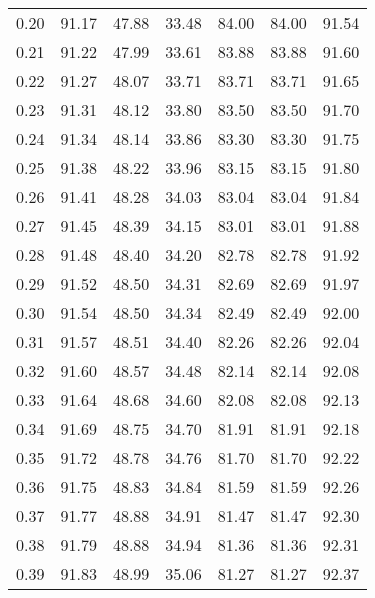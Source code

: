 \begin{tabular}{|c|c|c|c|c|c|c|}
      0.20 &     91.17 &     47.88 &      33.48 &   84.00 &      84.00 &         91.54 \\
      0.21 &     91.22 &     47.99 &      33.61 &   83.88 &      83.88 &         91.60 \\
      0.22 &     91.27 &     48.07 &      33.71 &   83.71 &      83.71 &         91.65 \\
      0.23 &     91.31 &     48.12 &      33.80 &   83.50 &      83.50 &         91.70 \\
      0.24 &     91.34 &     48.14 &      33.86 &   83.30 &      83.30 &         91.75 \\
      0.25 &     91.38 &     48.22 &      33.96 &   83.15 &      83.15 &         91.80 \\
      0.26 &     91.41 &     48.28 &      34.03 &   83.04 &      83.04 &         91.84 \\
      0.27 &     91.45 &     48.39 &      34.15 &   83.01 &      83.01 &         91.88 \\
      0.28 &     91.48 &     48.40 &      34.20 &   82.78 &      82.78 &         91.92 \\
      0.29 &     91.52 &     48.50 &      34.31 &   82.69 &      82.69 &         91.97 \\
      0.30 &     91.54 &     48.50 &      34.34 &   82.49 &      82.49 &         92.00 \\
      0.31 &     91.57 &     48.51 &      34.40 &   82.26 &      82.26 &         92.04 \\
      0.32 &     91.60 &     48.57 &      34.48 &   82.14 &      82.14 &         92.08 \\
      0.33 &     91.64 &     48.68 &      34.60 &   82.08 &      82.08 &         92.13 \\
      0.34 &     91.69 &     48.75 &      34.70 &   81.91 &      81.91 &         92.18 \\
      0.35 &     91.72 &     48.78 &      34.76 &   81.70 &      81.70 &         92.22 \\
      0.36 &     91.75 &     48.83 &      34.84 &   81.59 &      81.59 &         92.26 \\
      0.37 &     91.77 &     48.88 &      34.91 &   81.47 &      81.47 &         92.30 \\
      0.38 &     91.79 &     48.88 &      34.94 &   81.36 &      81.36 &         92.31 \\
      0.39 &     91.83 &     48.99 &      35.06 &   81.27 &      81.27 &         92.37 \\

\end{tabular}
